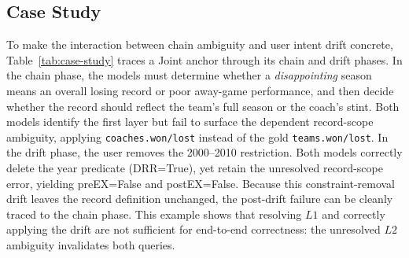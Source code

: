 \subsection{Case Study}
\label{subsec:case-study}

To make the interaction between chain ambiguity and user intent drift concrete, Table~\ref{tab:case-study} traces a Joint anchor through its chain and drift phases. In the chain phase, the models must determine whether a \emph{disappointing} season means an overall losing record or poor away-game performance, and then decide whether the record should reflect the team's full season or the coach's stint. Both models identify the first layer but fail to surface the dependent record-scope ambiguity, applying \texttt{coaches.won/lost} instead of the gold \texttt{teams.won/lost}. In the drift phase, the user removes the 2000--2010 restriction. Both models correctly delete the year predicate (DRR=True), yet retain the unresolved record-scope error, yielding preEX=False and postEX=False. Because this constraint-removal drift leaves the record definition unchanged, the post-drift failure can be cleanly traced to the chain phase. This example shows that resolving $L1$ and correctly applying the drift are not sufficient for end-to-end correctness: the unresolved $L2$ ambiguity invalidates both queries.